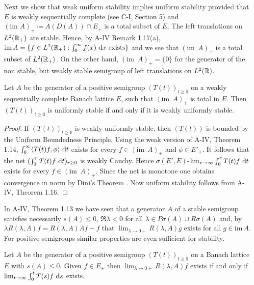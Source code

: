 Next we show that weak uniform stability implies uniform stability provided that $E$ is weakly sequentially complete (see C-I, Section 5) and $(\text{im }A)_{+} \coloneqq A(D(A)) \cap E_{+}$ is a total subset of $E$.
The left translations on $L^{2}(\mathbb{R}_{+})$ are stable.
Hence, by A-IV Remark 1.17(a), $\text{im}\,A = \{f \in L^{2}(\mathbb{R}_{+}) : \int_{0}^{\infty} f(x) \, \mathop{}\!\mathrm{d}{x} \text{ exists}\}$ and we see that $(\text{im }\, A)_{+}$ is a total subset of $L^{2}(\mathbb{R}_{+})$.
On the other hand, $(\text{im }\, A)_{+} = \{0\}$ for the generator of the non stable, but weakly stable semigroup of left translations on $L^{2}(\mathbb{R})$.

\begin{proposition}\label{prop:c4-1.7}
Let $A$ be the generator of a positive semigroup $(T(t))_{t\geq 0}$ on a weakly sequentially complete Banach lattice $E$, such that $(\text{im }\, A)_{+}$ is total in $E$.
Then $(T(t))_{t\geq 0}$ is uniformly stable if and only if it is weakly uniformly stable.
\end{proposition}

\begin{proof}
If $(T(t))_{t\geq 0}$ is weakly uniformly stable, then $(T(t))$ is bounded by the Uniform Boundedness Principle.
Using the weak version of A-IV, Theorem 1.14, $\int_{0}^{\infty} \langle T(t)f,\phi \rangle \, \mathop{}\!\mathrm{d}{t}$ exists for every $f \in (\text{im }\, A)_{+}$ and $\phi \in E'_{+}$.
It follows that the net $(\int_{0}^{r} T(t)f \, \mathop{}\!\mathrm{d}{t})_{r\geq 0}$ is weakly Cauchy.
Hence $\sigma(E',E)$-$\lim_{r \to \infty} \int_{0}^{r} T(t)f \, \mathop{}\!\mathrm{d}{t}$ exists for every $f \in (\text{im }\, A)_{+}$.
Since the net is monotone one obtains convergence in norm by Dini's Theorem \citet [II. Theorem~5.9]{schaefer:1974}.
Now uniform stability follows from A-IV, Theorem 1.16.
\end{proof}

In A-IV, Theorem 1.13 we have seen that a generator $A$ of a stable semigroup satisfies necessarily $s(A) \leq 0$, $\Re \lambda < 0$ for all $\lambda \in P{\sigma}(A) \cup R{\sigma}(A)$ and, by $\lambda R(\lambda,A)f = R(\lambda,A)Af + f$ that $\lim_{\lambda \to 0+} R(\lambda,A)g$ exists for all $g \in \text{im} \, A$. 
For positive semigroups similar properties are even sufficient for stability.

\begin{lemma}\label{lem:c4-1.8}
Let $A$ be the generator of a positive semigroup $(T(t))_{t\geq 0}$ on a Banach lattice $E$ with $s(A) \leq 0$.
Given $f \in E_{+}$ then $\lim_{\lambda \to 0+} R(\lambda,A)f$ exists if and only if $\lim_{t \to \infty} \int_{0}^{t} T(s)f \, \mathop{}\!\mathrm{d}{s}$ exists.
\end{lemma}

